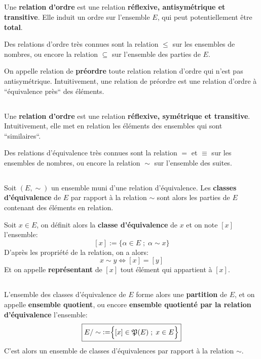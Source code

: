 \subsection*{}
Une \textbf{relation d'ordre} est une relation \textbf{réflexive, antisymétrique et transitive}. Elle induit un ordre sur l'ensemble \(E\), qui peut potentiellement être \textbf{total}.\<

Des relations d'ordre très connues sont la relation \(\boxed{\leq}\) sur les ensembles de nombres, ou encore la relation \(\boxed{\subseteq}\) sur l'ensemble des parties de \(E\).\<

On appelle relation de \textbf{préordre} toute relation relation d'ordre qui n'est pas antisymétrique. Intuitivement, une relation de préordre est une relation d'ordre à ``équivalence près`` des éléments.

\subsection*{}
Une \textbf{relation d'ordre} est une relation \textbf{réflexive, symétrique et transitive}. Intuitivement, elle met en relation les éléments des ensembles qui sont ``similaires``.\<

Des relations d'équivalence très connues sont la relation \(\boxed{=}\) et \(\boxed{\equiv}\) sur les ensembles de nombres, ou encore la relation \(\boxed{\sim}\) sur l'ensemble des suites.\<

\subsection*{}
Soit \((E, \sim)\) un ensemble muni d'une relation d'équivalence.\+
Les \textbf{classes d'équivalence} de \(E\) par rapport à la relation \(\sim\) sont alors les parties de \(E\) contenant des éléments en relation.\<

Soit \(x \in E\), on définit alors la \textbf{classe d'équivalence} de \(x\) et on note \([x]\) l'ensemble:
\[
    \boxed{
        [x] := \Bigr\{ \alpha \in E \; ; \; \alpha \sim x \Bigr\}
    }
\]
D'après les propriété de la relation, on a alors:
\[
    x \sim y \Longleftrightarrow [x] = [y]
\]
Et on appelle \textbf{représentant} de \([x]\) tout élément qui appartient à \([x]\).

\subsection*{}
L'ensemble des classes d'équivalence de \(E\) forme alors une \textbf{partition} de \(E\), et on appelle \textbf{ensemble quotient}, ou encore \textbf{ensemble quotienté par la relation d'équivalence} l'ensemble:
\[
    \boxed{
        E / \sim \; := \Bigr\{ [x] \in \mathbf{\mathfrak{P}}(E) \; ; \; x \in E \Bigr\}
    }
\]
C'est alors un ensemble de classes d'équivalences par rapport à la relation \(\sim\).\<

